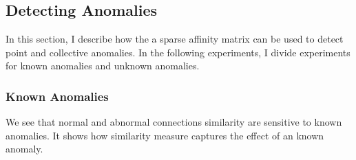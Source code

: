 
\subsection{Detecting Anomalies}
\label{subsec:detectinganomalies}
In this section, I describe how the a sparse affinity matrix can be used to detect point and collective anomalies. 
In the following experiments, I divide experiments for known anomalies and unknown anomalies. 

\subsubsection{Known Anomalies}
We see that normal and abnormal connections similarity are sensitive to known anomalies. 
It shows how similarity measure captures the effect of an known anomaly. 

